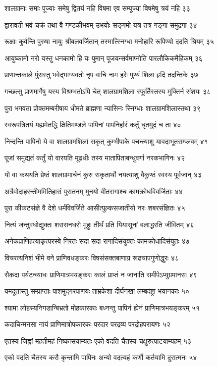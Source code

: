 शालग्रामाः समाः पूज्याः समेषु द्वितयं नहि
विषमा एव सम्पूज्या विषमेषु त्रयं नहि ३३

द्वारावती भवं चक्रं तथा वै गण्डकीभवम्
उभयोः सङ्गमो यत्र तत्र गङ्गा समुद्रगा ३४

रूक्षाः कुर्वन्ति पुरुषा नायुः श्रीबलवर्जितान्
तस्मात्स्निग्धा मनोहारि रूपिण्यो ददति श्रियम् ३५

आयुष्कामो नरो यस्तु धनकामो हि यः पुमान्
पूजयन्सर्वमाप्नोति पारलौकिकमैहिकम् ३६

प्राणान्तकाले पुंसस्तु भवेद्भाग्यवतो नृप
वाचि नाम हरेः पुण्यं शिला हृदि तदन्तिके ३७

गच्छत्सु प्राणमार्गेषु यस्य विश्रम्भतोऽपि चेत्
शालग्रामशिला स्फूर्तिस्तस्य मुक्तिर्न संशयः ३८

पुरा भगवता प्रोक्तमम्बरीषाय धीमते
ब्राह्मणा न्यासिनः स्निग्धाः शालग्रामशिलास्तथा ३९

स्वरूपत्रितयं मह्यमेतद्धि क्षितिमण्डले
पापिनां पापनिर्हारं कर्तुं धृतमुदं च ता ४०

निन्दन्ति पापिनो ये वा शालग्रामशिलां सकृत्
कुम्भीपाके पचन्त्याशु यावदाभूतसम्प्लवम् ४१

पूजां समुद्यतं कर्तुं यो वारयति मूढधीः
तस्य मातापिताबन्धुवर्गा नरकभागिनः ४२

यो वा कथयति प्रेष्ठं शालग्रामार्चनं कुरु
सकृतार्थो नयत्याशु वैकुण्ठं स्वस्य पूर्वजान् ४३

अत्रैवोदाहरन्तीममितिहासं पुरातनम्
मुनयो वीतरागाश्च कामक्रोधविवर्जिताः ४४

पुरा कीकटसंज्ञे वै देशे धर्मविवर्जिते
आसीत्पुल्कसजातीयो नरः शबरसंज्ञितः ४५

नित्यं जन्तुवधोद्युक्तः शरासनधरो मुहुः
तीर्थं प्रति यियासूनां बलाद्धरति जीवितम् ४६

अनेकप्राणिहत्याकृत्परस्वे निरतः सदा
सदा रागादिसंयुक्तः कामक्रोधादिसंयुतः ४७

विचरत्यनिशं भीमे वने प्राणिवधङ्करः
विषसंसक्तबाणाग्र रूढचापगुणोद्धुरः ४८

सैकदा पर्यटन्व्याधः प्राणिमात्रभयङ्करः
कालं प्राप्तं न जानाति समीपेऽप्युग्रमानसः ४९

यमदूतास्तु सम्प्राप्ताः पाशमुद्गरपाणयः
ताम्रकेशा दीर्घनखा लम्बदंष्ट्रा भयानकाः ५०

श्यामा लोहस्यनिगडान्बिभ्रतो मोहकारकाः
बध्नन्तु पापिनं ह्येनं प्राणिमात्रभयङ्करम् ५१

कदाचिन्मनसा नायं प्राणिमात्रोपकारकः
परदार परद्रव्य परद्रोहपरायणः ५२

एतस्य जिह्वां महतीमहं निष्कासयाम्यतः
एको वदति चैतस्य चक्षुरुत्पाटयाम्यहम् ५३

एको वदति चैतस्य करौ कृन्तामि पापिनः
अन्यो वदत्यहं कर्णौ कर्तयामि दुरात्मनः ५४

